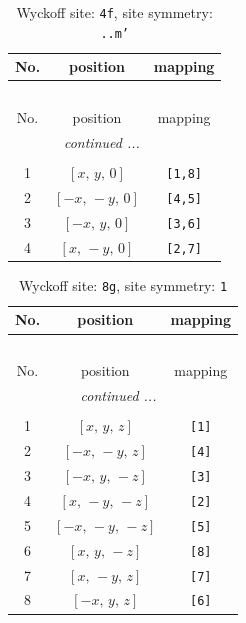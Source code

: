 \documentclass[fleqn,8pt]{jsarticle}
\begin{document}
\begin{longtable}{ccc}
\caption{Wyckoff site: {\tt 4f}, site symmetry: {\tt ..m'}}
 \\
 \hline \hline
No. & position & mapping \\ \hline \endfirsthead

\multicolumn{2}{l}{\tablename\ \thetable{}} \\
 \hline \hline
No. & position & mapping \\ \hline \endhead

 \hline \hline
\multicolumn{2}{r}{\footnotesize\it continued ...} \\ \endfoot

 \hline \hline
\multicolumn{2}{r}{} \\ \endlastfoot

1 & $\left[ x,\, y,\, 0 \right]$ & {\tt [1,8]} \\ \hline
2 & $\left[ - x,\, - y,\, 0 \right]$ & {\tt [4,5]} \\ \hline
3 & $\left[ - x,\, y,\, 0 \right]$ & {\tt [3,6]} \\ \hline
4 & $\left[ x,\, - y,\, 0 \right]$ & {\tt [2,7]} \\
\end{longtable}
\renewcommand{\arraystretch}{1.2}
\begin{longtable}{ccc}
\caption{Wyckoff site: {\tt 8g}, site symmetry: {\tt 1}}
 \\
 \hline \hline
No. & position & mapping \\ \hline \endfirsthead

\multicolumn{2}{l}{\tablename\ \thetable{}} \\
 \hline \hline
No. & position & mapping \\ \hline \endhead

 \hline \hline
\multicolumn{2}{r}{\footnotesize\it continued ...} \\ \endfoot

 \hline \hline
\multicolumn{2}{r}{} \\ \endlastfoot

1 & $\left[ x,\, y,\, z \right]$ & {\tt [1]} \\ \hline
2 & $\left[ - x,\, - y,\, z \right]$ & {\tt [4]} \\ \hline
3 & $\left[ - x,\, y,\, - z \right]$ & {\tt [3]} \\ \hline
4 & $\left[ x,\, - y,\, - z \right]$ & {\tt [2]} \\ \hline
5 & $\left[ - x,\, - y,\, - z \right]$ & {\tt [5]} \\ \hline
6 & $\left[ x,\, y,\, - z \right]$ & {\tt [8]} \\ \hline
7 & $\left[ x,\, - y,\, z \right]$ & {\tt [7]} \\ \hline
8 & $\left[ - x,\, y,\, z \right]$ & {\tt [6]} \\
\end{longtable}
\end{document}
